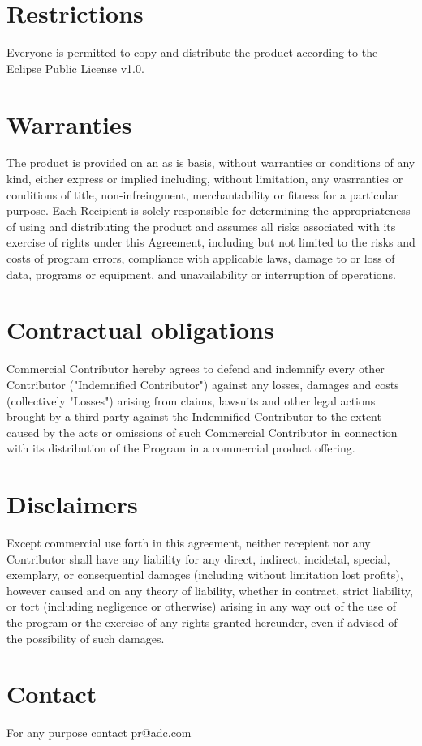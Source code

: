 \section{Restrictions}
Everyone is permitted to copy and distribute the product according to the
Eclipse Public License v1.0.

\section{Warranties}
The product is provided on an as is basis, without warranties or conditions of
any kind, either express or implied including, without limitation, any
wasrranties or conditions of title, non-infreingment, merchantability or
fitness for a particular purpose. Each Recipient is solely responsible for
determining the appropriateness of using and distributing the product and
assumes all risks associated with its exercise of rights under this Agreement,
including but not limited to the risks and costs of program errors, compliance
with applicable laws, damage to or loss of data, programs or equipment, and
unavailability or interruption of operations.

\section{Contractual obligations}
Commercial Contributor hereby agrees to defend and indemnify every other
Contributor ("Indemnified Contributor") against any losses, damages and costs
(collectively "Losses") arising from claims, lawsuits and other legal actions
brought by a third party against the Indemnified Contributor to the extent
caused by the acts or omissions of such Commercial Contributor in connection
with its distribution of the Program in a commercial product offering.

\section{Disclaimers}
Except commercial use forth in this agreement, neither recepient nor any
Contributor shall have any liability for any direct, indirect, incidetal,
special, exemplary, or consequential damages (including without limitation lost
profits), however caused and on any theory of liability, whether in contract,
strict liability, or tort (including negligence or otherwise) arising in any way
out of the use of the program or the exercise of any rights granted hereunder,
even if advised of the possibility of such damages.

\section{Contact}
For any purpose contact pr@adc.com